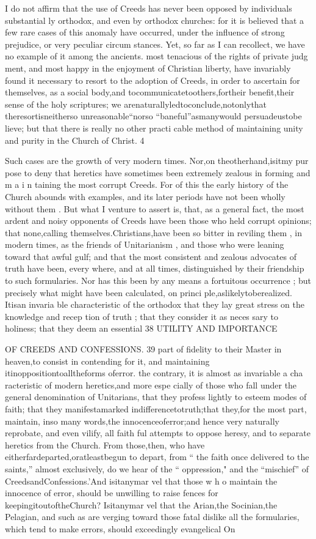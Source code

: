 \documentclass[
]{book}
\begin{document}
I do not affirm that the use of Creeds has
never been opposed by individuals substantial ly orthodox, and even by orthodox churches: for it is believed that a few rare cases of this anomaly have occurred, under the influence of strong prejudice, or very peculiar circum stances. Yet, so far as I can recollect, we have no example of it among the ancients.
most tenacious of the rights of private judg ment, and most happy in the enjoyment of
Christian liberty, have invariably found it necessary to resort to the adoption of Creeds,
in order to ascertain for themselves, as a social body,and tocommunicatetoothers,fortheir benefit,their sense of the holy scriptures;
we arenaturallyledtoconclude,notonlythat theresortisneitherso unreasonable``norso
``baneful''asmanywould persuadeustobe lieve; but that there is really no other practi cable method of maintaining unity and purity in the Church of Christ.
4

Such cases are the growth of very modern times. Nor,on theotherhand,isitmy pur pose to deny that heretics have sometimes
been extremely zealous in forming and m a i n taining the most corrupt Creeds. For of this the early history of the Church abounds with examples, and its later periods have not been wholly without them . But what I venture to assert is, that, as a general fact, the most ardent and noisy opponents of Creeds have been those who held corrupt opinions; that none,calling themselves.Christians,have been so bitter in reviling them , in modern times, as the friends of Unitarianism , and those who were leaning toward that awful gulf; and that the most consistent and zealous advocates of truth have been, every where, and at all
times, distinguished by their friendship to such formularies. Nor has this been by any
means a fortuitous occurrence ; but precisely what might have been calculated, on princi ple,aslikelytoberealized. Itisan invaria
ble characteristic of the orthodox that they lay great stress on the knowledge and recep tion of truth ; that they consider it as neces sary to holiness; that they deem an essential
38 UTILITY AND IMPORTANCE

OF CREEDS AND CONFESSIONS. 39
part of fidelity to their Master in heaven,to
consist in contending for it, and maintaining itinoppositiontoalltheforms oferror.
the contrary, it is almost as invariable a cha racteristic of modern heretics,and more espe
cially of those who fall under the general denomination of Unitarians, that they profess
lightly to esteem modes of faith; that they manifestamarked indifferencetotruth;that
they,for the most part, maintain, inso many words,the innocenceoferror;and hence very naturally reprobate, and even vilify, all faith ful attempts to oppose heresy, and to separate
heretics from the Church. From those,then, who have eitherfardeparted,oratleastbegun to depart, from `` the faith once delivered to
the saints,'' almost exclusively, do we hear of the `` oppression," and the ``mischief'' of CreedsandConfessions.'And isitanymar vel that those w h o maintain the innocence of
error, should be unwilling to raise fences for
keepingitoutoftheChurch? Isitanymar vel that the Arian,the Socinian,the Pelagian,
and such as are verging toward those fatal
dislike all the formularies, which tend to make
errors, should exceedingly evangelical
On
\end{document}
